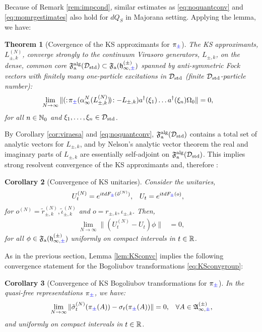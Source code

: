 \documentclass[a4paper, 11pt]{article}
\newcommand{\fA}{\mathfrak{A}}\newcommand{\cA}{\mathcal{A}}\newcommand{\dA}{\mathds{A}}\newcommand{\sA}{\mathscr{A}}
\newcommand{\ua}{\textup a}
\newcommand{\fF}{\mathfrak{F}}\newcommand{\cF}{\mathcal{F}}\newcommand{\dF}{\mathds{F}}\newcommand{\sF}{\mathscr{F}}
\newcommand{\fh}{\mathfrak{h}}
\DeclareMathOperator{\1}{\mathds{1}}
\DeclareMathOperator{\std}{std}
\DeclareMathOperator{\alg}{alg}
\newtheorem{thm}{Theorem} [section]
\newtheorem{cor}[thm]{Corollary}
\begin{document}
Because of Remark \ref{rem:impcond}, similar estimates as \eqref{eq:noquantconv} and \eqref{eq:momrgestimates} also hold for $dQ_{S}$ in Majorana setting. Applying the lemma, we have:
\begin{thm}[Covergence of the KS approximants for $\pi_{{\color{blue}\pm}}$]
\label{thm:KSconvc}
The KS approximants, $L^{(N)}_{\pm,k}$, converge strongly to the continuum Virasoro generators, $L_{\pm,k}$, on the dense, common core $\fF^{\alg}_{\ua}(\cD_{\std})\subset\fF_{\ua}(\fh^{(\pm)}_{\infty,{\color{blue}\pm}})$ spanned by anti-symmetric Fock vectors with finitely many one-particle excitations in $\cD_{\std}$ (finite $\cD_{\std}$-particle number):
\begin{align}
\label{eq:latviraconvc}
\lim_{N\rightarrow\infty}\|(:\!\pi_{{\color{blue}\pm}}(\alpha^{N}_{\infty}(L^{(N)}_{\pm,k})\!)\!: - L_{\pm,k})a^{\dagger}(\xi_{1})\dots a^{\dagger}(\xi_{n})\Omega_{0}\| & = 0,
\end{align}
for all $n\in\mathbb{N}_{0}$ and $\xi_{1},\dots,\xi_{n}\in\cD_{\std}$.
\end{thm}
By Corollary \ref{cor:viraesa} and \eqref{eq:noquantconv}, $\fF^{\alg}_{\ua}(\cD_{\std})$ contains a total set of analytic vectors for  $L_{\pm,k}$, and by Nelson's analytic vector theorem \cite{NelsonAnalyticVectors} the real and imaginary parts of $L_{\pm,k}$ are essentially self-adjoint on $\fF^{\alg}_{\ua}(\cD_{\std})$. This implies strong resolvent convergence of the KS approximants and, therefore \cite{ReedMethodsOfModern1}:
\begin{cor}[Convergence of KS unitaries]
\label{cor:KSunitariesc}
Consider the unitaries,
\begin{align*}
U^{(N)}_{t} & = e^{it dF_{{\color{blue}\pm}}(\tilde{o}^{(N)})}, & U_{t} & = e^{it dF_{{\color{blue}\pm}}(o)},
\end{align*}
for $o^{(N)} = \tilde{r}^{(N)}_{\pm,k}, \tilde{\iota}^{(N)}_{\pm,k}$ and $o = r_{\pm,k}, \iota_{\pm,k}$. Then,
\begin{align*}
\lim_{N\rightarrow\infty}\|(U^{(N)}_{t}-U_{t})\phi\| & = 0,
\end{align*}
for all $\phi\in\fF_{\ua}(\fh^{(\pm)}_{\infty,{\color{blue}\pm}})$ uniformly on compact intervals in $t\in\mathbb{R}$.
\end{cor}
As in the previous section, Lemma \ref{lem:KSconvc} implies the following convergence statement for the Bogoliubov transformations \eqref{eq:KSconvgroup}:
\begin{cor}[Convergence of KS Bogoliubov transformations for $\pi_{{\color{blue}\pm}}$]
\label{cor:KSconvbogc}
In the quasi-free representations $\pi_{{\color{blue}\pm}}$, we have:
\begin{align*}
\lim_{N\rightarrow\infty}\|\tilde{\sigma}^{(N)}_{t}(\pi_{{\color{blue}\pm}}(A)) - \sigma_{t}(\pi_{{\color{blue}\pm}}(A))\| & = 0, & \forall A\in\fA^{(\pm)}_{\infty,{\color{blue}\pm}},
\end{align*}
and uniformly on compact intervals in $t\in\mathbb{R}$.
\end{cor}
\end{document}
